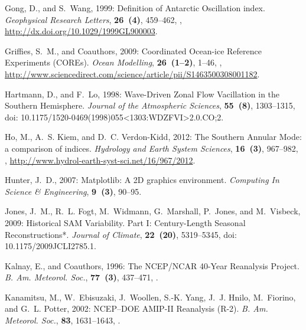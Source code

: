 \documentclass{ametsoc}
\begin{document}
\begin{thebibliography}{53}
Gong, D., and S.~Wang, 1999: {Definition of Antarctic Oscillation index}.
  \textit{Geophysical Research Letters}, \textbf{26~(4)}, 459--462,
  ,
  \urlprefix\url{http://dx.doi.org/10.1029/1999GL900003}.

Griffies, S.~M., and Coauthors, 2009: {Coordinated Ocean-ice Reference
  Experiments (COREs)}. \textit{Ocean Modelling}, \textbf{26~(1--2)}, 1--46,
  ,
  \urlprefix\url{http://www.sciencedirect.com/science/article/pii/S1463500308001182}.

Hartmann, D., and F.~Lo, 1998: {Wave-Driven Zonal Flow Vacillation in the
  Southern Hemisphere}. \textit{Journal of the Atmospheric Sciences},
  \textbf{55~(8)}, 1303--1315, doi:
  10.1175/1520-0469(1998)055<1303:WDZFVI>2.0.CO;2.

Ho, M., A.~S. Kiem, and D.~C. Verdon-Kidd, 2012: {The Southern Annular Mode: a
  comparison of indices}. \textit{Hydrology and Earth System Sciences},
  \textbf{16~(3)}, 967--982, ,
  \urlprefix\url{http://www.hydrol-earth-syst-sci.net/16/967/2012}.

Hunter, J.~D., 2007: {Matplotlib: A 2D graphics environment}. \textit{Computing
  In Science \& Engineering}, \textbf{9~(3)}, 90--95.

Jones, J.~M., R.~L. Fogt, M.~Widmann, G.~Marshall, P.~Jones, and M.~Visbeck,
  2009: {Historical SAM Variability. Part I: Century-Length Seasonal
  Reconstructions*}. \textit{Journal of Climate}, \textbf{22~(20)}, 5319--5345,
  doi: 10.1175/2009JCLI2785.1.

Kalnay, E., and Coauthors, 1996: {The {NCEP/NCAR} 40-Year Reanalysis Project}.
  \textit{B. {A}m. {M}eteorol. {S}oc.}, \textbf{77~(3)}, 437--471,
  .

Kanamitsu, M., W.~Ebisuzaki, J.~Woollen, S.-K. Yang, J.~J. Hnilo, M.~Fiorino,
  and G.~L. Potter, 2002: {{NCEP--DOE AMIP-II} {R}eanalysis (R-2)}. \textit{B.
  {A}m. {M}eteorol. {S}oc.}, \textbf{83}, 1631--1643,
  .


\end{thebibliography}
\end{document}
